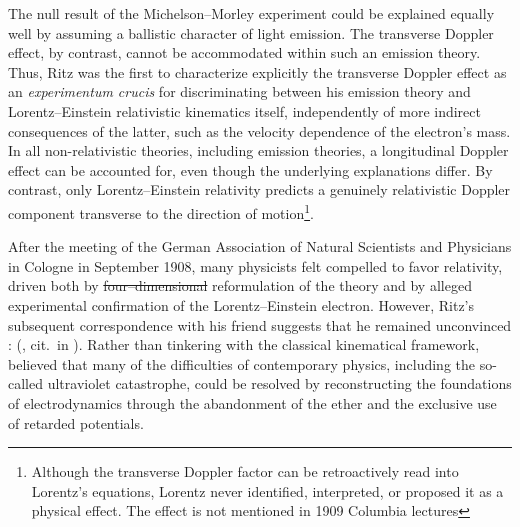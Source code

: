 \documentclass[submitted,12pt]{article} %
\newcommand{\tDe}{transverse Doppler effect\xspace}
\providecommand{\DIFadd}[1]{{\protect\color{blue}\uwave{#1}}} %
\providecommand{\DIFdel}[1]{{\protect\color{red}\sout{#1}}}                      %
\providecommand{\DIFaddbegin}{} %
\providecommand{\DIFaddend}{} %
\providecommand{\DIFdelbegin}{} %
\providecommand{\DIFdelend}{} %
\begin{document}
%
The null result of the Michelson--Morley experiment could be explained equally well by assuming a ballistic character of light emission. The \tDe, by contrast, cannot be accommodated within such an emission theory. Thus, Ritz was the first to characterize explicitly the transverse Doppler effect as an \textit{experimentum crucis} for discriminating between his emission theory and Lorentz--Einstein relativistic kinematics itself, independently of more indirect consequences of the latter, such as the velocity dependence of the electron’s mass. In all non-relativistic theories, including emission theories, a longitudinal Doppler effect can be accounted for, even though the underlying explanations differ. By contrast, only Lorentz--Einstein relativity predicts a genuinely relativistic Doppler component transverse to the direction of motion\footnote{Although the transverse Doppler factor can be retroactively read into Lorentz’s equations, Lorentz never identified, interpreted, or proposed it as a physical effect. The effect is not mentioned in  1909 Columbia lectures}.

After the meeting of the German Association of Natural Scientists and Physicians in Cologne in September 1908, many physicists felt compelled to favor relativity, driven both by  \DIFdelbegin \DIFdel{four--dimensional }\DIFdelend \DIFaddbegin \DIFadd{four-dimensional }\DIFaddend reformulation of the theory and by  alleged experimental confirmation of the Lorentz--Einstein electron. However, Ritz’s subsequent correspondence with his friend \Ehr suggests that he remained unconvinced \citep[268--271]{Staley2008}:  (, cit.\ in \cite[270\psq\tm]{Staley2008}). Rather than tinkering with the classical kinematical framework, \citet{Ritz1908} believed that many of the difficulties of contemporary physics, including the so-called ultraviolet catastrophe, could be resolved by reconstructing the foundations of electrodynamics through the abandonment of the ether and the exclusive use of retarded potentials.

\end{document}
